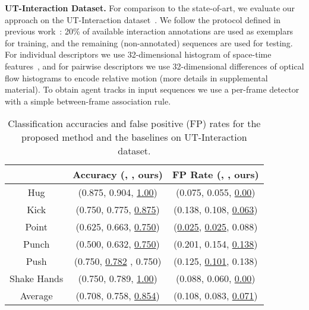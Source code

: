 

\vspace{0.05in}\noindent\noindent\textbf{UT-Interaction Dataset.} For comparison to the state-of-art, we evaluate our approach on the UT-Interaction dataset~\cite{Ryoo:group}. We follow the protocol defined in previous work~\cite{Ryoo:group,Amer:group}: 20\% of available interaction annotations are used as exemplars for training, and the remaining (non-annotated) sequences are used for testing. For individual descriptors we use 32-dimensional histogram of space-time features~\cite{Dollar:STIP}, and for pairwise descriptors we use 32-dimensional differences of optical flow histograms to encode relative motion (more details in supplemental material). To obtain agent tracks in input sequences we use a per-frame detector~\cite{Pedro:detect} with a simple between-frame association rule.

\begin{table}[ht]
\vspace{-5pt}
\centering \caption{Classification accuracies and false positive (FP) rates for the proposed method and the baselines on UT-Interaction dataset.}
\footnotesize{
\begin{tabular}{|c||c|c|}
\hline   & Accuracy (\cite{Ryoo:group}, \cite{Amer:group}, ours) & FP Rate (\cite{Ryoo:group}, \cite{Amer:group}, ours) \\
\hline Hug &  (0.875, 0.904, \underline{1.00}) & (0.075, 0.055, \underline{0.00}) \\
\hline Kick &  (0.750, 0.775, \underline{0.875})  & (0.138, 0.108, \underline{0.063})\\
\hline Point & (0.625, 0.663,  \underline{0.750}) & (\underline{0.025}, \underline{0.025}, 0.088)\\
\hline Punch & (0.500, 0.632, \underline{0.750})  & (0.201, 0.154,  \underline{0.138})\\
\hline Push & (0.750, \underline{0.782} , 0.750)  & (0.125, \underline{0.101},  0.138)\\
\hline Shake Hands &  (0.750, 0.789, \underline{1.00}) & (0.088, 0.060, \underline{0.00}) \\
\hline\hline Average &  (0.708, 0.758, \underline{0.854})  & (0.108, 0.083,  \underline{0.071})\\
\hline 
\end{tabular}
}
\label{UTaccuFP}
\vspace{-5pt}
\end{table}


